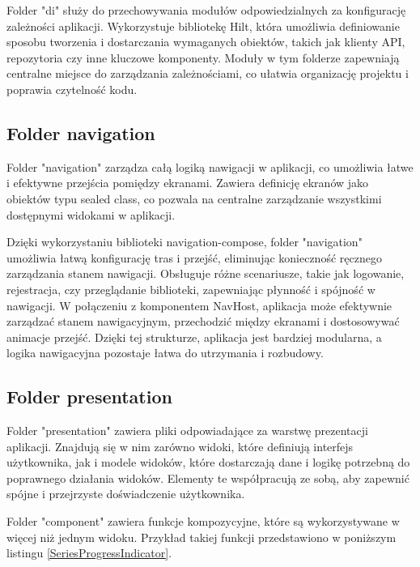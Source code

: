 \documentclass[12pt,twoside]{article}
\begin{document}
Folder "di" służy do przechowywania modułów odpowiedzialnych za konfigurację zależności aplikacji. Wykorzystuje 
bibliotekę Hilt, która umożliwia definiowanie sposobu tworzenia i dostarczania wymaganych obiektów, takich jak 
klienty API, repozytoria czy inne kluczowe komponenty. Moduły w tym folderze zapewniają centralne miejsce do 
zarządzania zależnościami, co ułatwia organizację projektu i poprawia czytelność kodu.

\subsection{Folder navigation}

Folder "navigation" zarządza całą logiką nawigacji w aplikacji, co umożliwia łatwe i efektywne przejścia pomiędzy 
ekranami. Zawiera definicję ekranów jako obiektów typu sealed class, co pozwala na centralne zarządzanie wszystkimi 
dostępnymi widokami w aplikacji.

Dzięki wykorzystaniu biblioteki navigation-compose, folder "navigation" umożliwia łatwą konfigurację tras i przejść, 
eliminując konieczność ręcznego zarządzania stanem nawigacji. Obsługuje różne scenariusze, takie jak logowanie, 
rejestracja, czy przeglądanie biblioteki, zapewniając płynność i spójność w nawigacji. 
W połączeniu z komponentem NavHost, aplikacja może efektywnie zarządzać stanem nawigacyjnym, przechodzić między 
ekranami i dostosowywać animacje przejść. Dzięki tej strukturze, aplikacja jest bardziej modularna, a logika 
nawigacyjna pozostaje łatwa do utrzymania i rozbudowy.

\subsection{Folder presentation}

Folder "presentation" zawiera pliki odpowiadające za warstwę prezentacji aplikacji. Znajdują się w nim zarówno widoki, 
które definiują interfejs użytkownika, jak i modele widoków, które dostarczają dane i logikę potrzebną do poprawnego 
działania widoków. Elementy te współpracują ze sobą, aby zapewnić spójne i przejrzyste doświadczenie użytkownika.

Folder "component" zawiera funkcje kompozycyjne, które są wykorzystywane w więcej niż jednym widoku. Przykład takiej 
funkcji przedstawiono w poniższym listingu \ref{SeriesProgressIndicator}.
\end{document}
